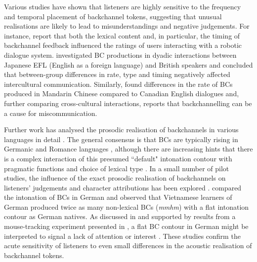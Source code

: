 Various studies have shown that listeners are highly sensitive to the frequency and temporal placement of backchannel tokens, suggesting that unusual realisations are likely to lead to misunderstandings and negative judgements. For instance, \citet{fujieConversationRobotBackchannel2004a} report that both the lexical content and, in particular, the timing of backchannel feedback influenced the ratings of users interacting with a robotic dialogue system. \citet{cutroneCaseStudyExamining2005,cutroneCrossculturalExaminationBackchannel2014} investigated BC productions in dyadic interactions between Japanese EFL (English as a foreign language) and British speakers and concluded that between-group differences in rate, type and timing negatively affected intercultural communication. Similarly, \citet{liBackchannelResponsesMisleading2006} found differences in the rate of BCs produced in Mandarin Chinese compared to Canadian English dialogues and, further comparing cross-cultural interactions, reports that backchannelling can be a cause for miscommunication.

Further work has analysed the prosodic realisation of backchannels in various languages in detail \citep{benusProsodyBackchannelsAmerican2007,caspersMelodicCharacteristicsBackchannels2000,savinoIntonationalStrategiesBackchanneling2010,stocksmeierSynthesisProsodicAttitudinal2007}. The general consensus is that BCs are typically rising in Germanic and Romance languages \citep[but more often falling in, e.g., Japanese or Vietnamese; see][]{haProsodyVietnameseIntonational2012,haModellingInteractionIntonation2010}, although there are increasing hints that there is a complex interaction of this presumed ``default" intonation contour with pragmatic functions and choice of lexical type \citep[see the results in this section and subsequent related work in][]{sbrannaBackchannellingLanguagesRate2022}. In a small number of pilot studies, the influence of the exact prosodic realisation of backchannels on listeners’ judgements and character attributions has been explored \citep{haSpeechProsodyPossible2016,wehrleExploringDynamicsBackchannel2018,wehrleFunctionProsodicForm2019}. \citet{wehrleFunctionProsodicForm2019} compared the intonation of BCs in German and observed that Vietnamese learners of German produced twice as many non-lexical BCs (\emph{mmhm}) with a flat intonation contour as German natives. As discussed in \citet{haSpeechProsodyPossible2016} and supported by results from a mouse-tracking experiment presented in \citet{wehrleExploringDynamicsBackchannel2018}, a flat BC contour in German might be interpreted to signal a lack of attention or interest \citep[see also][]{stocksmeierSynthesisProsodicAttitudinal2007}. These studies confirm the acute sensitivity of listeners to even small differences in the acoustic realisation of backchannel tokens.

